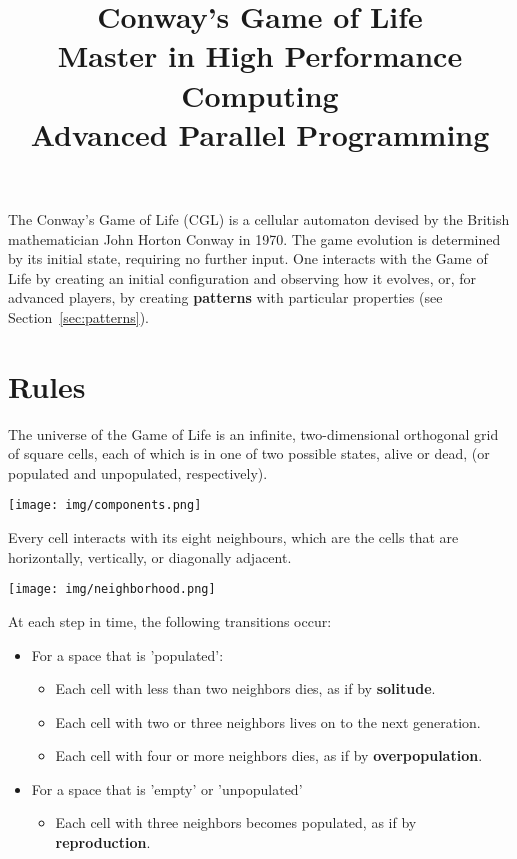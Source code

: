 \documentclass[a4paper,12pt,openany]{article}
\title{{\Huge\bf Conway's Game of Life}\\
{\Large Master in High Performance Computing\\
Advanced Parallel Programming}}
\begin{document}
\maketitle

The Conway's Game of Life (CGL) is a cellular automaton devised by the British mathematician John Horton Conway in 1970.
The game evolution is determined by its initial state, requiring no further input.
One interacts with the Game of Life by creating an initial configuration and observing how it evolves, or,
for advanced players, by creating {\bf patterns} with particular properties (see Section~\ref{sec:patterns}).

\section{Rules}

The universe of the Game of Life is an infinite,
two-dimensional orthogonal grid of square cells,
each of which is in one of two possible states, alive or dead,
(or populated and unpopulated, respectively).

\begin{center}
\texttt{[image: img/components.png]}
\end{center}

Every cell interacts with its eight neighbours,
which are the cells that are horizontally, vertically, or diagonally adjacent.

\begin{center}
\texttt{[image: img/neighborhood.png]}
\end{center}

At each step in time, the following transitions occur:

\begin{itemize}
\item For a space that is 'populated':
  \begin{itemize}
  \item Each cell with less than two neighbors dies, as if by {\bf solitude}.
  \item Each cell with two or three neighbors lives on to the next generation.
  \item Each cell with four or more neighbors dies, as if by {\bf overpopulation}.
  \end{itemize}
\item For a space that is 'empty' or 'unpopulated'
  \begin{itemize}
  \item Each cell with three neighbors becomes populated, as if by {\bf reproduction}.
  \end{itemize}
\end{itemize}
\end{document}

